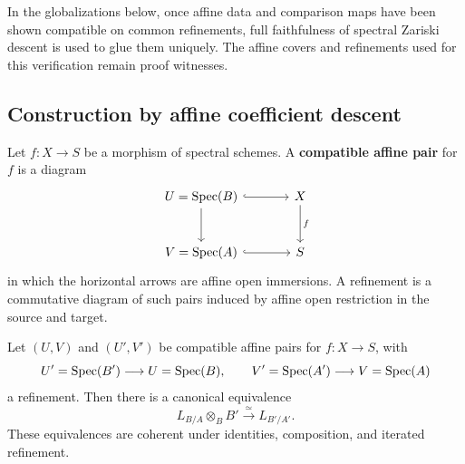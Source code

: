 In the globalizations below, once affine data and comparison maps have been
shown compatible on common refinements, full faithfulness of spectral Zariski
descent is used to glue them uniquely. The affine covers and refinements used
for this verification remain proof witnesses.

\subsection{Construction by affine coefficient descent}

\begin{definition}
\label{def:compatible-affine-pair-cotangent}
Let \(f:X\to S\) be a morphism of spectral schemes. A \textbf{compatible
affine pair} for \(f\) is a diagram
\[
\begin{tikzcd}[column sep=large,row sep=large]
    U=\Spec(B) \arrow[r,hook] \arrow[d]
        & X \arrow[d,"f"]
    \\
    V=\Spec(A) \arrow[r,hook]
        & S
\end{tikzcd}
\]
in which the horizontal arrows are affine open immersions. A refinement is a
commutative diagram of such pairs induced by affine open restriction in the
source and target.
\end{definition}

\begin{lemma}
\label{lem:affine-cotangent-compatible-pairs}
Let \((U,V)\) and \((U',V')\) be compatible affine pairs for
\(f:X\to S\), with
\[
    U'=\operatorname{Spec}(B')\longrightarrow U=\operatorname{Spec}(B),
    \qquad
    V'=\operatorname{Spec}(A')\longrightarrow V=\operatorname{Spec}(A)
\]
a refinement. Then there is a canonical equivalence
\[
    L_{B/A}\otimes_BB'
    \xrightarrow{\simeq}
    L_{B'/A'}.
\]
These equivalences are coherent under identities, composition, and iterated
refinement.
\end{lemma}

